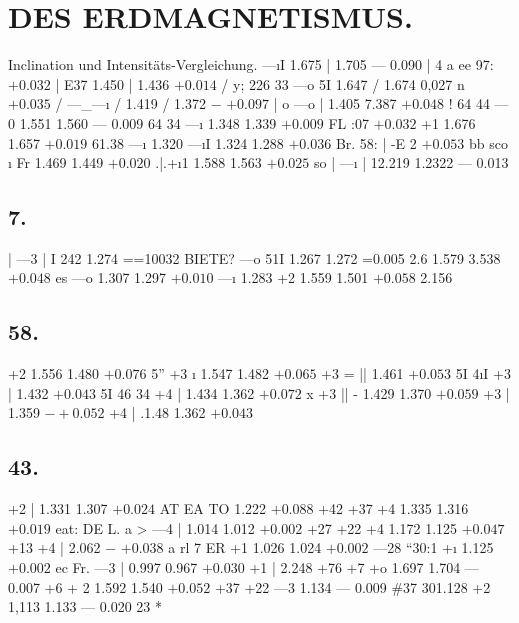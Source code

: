 \documentclass[12pt,a4paper]{article}
\begin{document}
\section*{DES ERDMAGNETISMUS.}
Inclination und Intensitäts-Vergleichung.
---\i{}I 1.675 | 1.705 --- 0.090 | 4 a ee 97\textdegree{}:
$+ 0.032$
| E37 1.450 | 1.436
$+ 0.014$
/ y; 226 33 ---o 5I 1.647 / 1.674 0,027 n%
$+ 0.035$
/ ---\_---\i{} / 1.419 / 1.372
$-$
$+ 0.097$
| o ---o | 1.405 7.387
$+ 0.048$
! 64 44 --- 0 1.551 1.560 --- 0.009 64 34 ---\i{} 1.348 1.339
$+ 0.009$
FL :07%
$+ 0.032$
+1 1.676 1.657
$+ 0.019$
61.38 ---\i{} 1.320 ---\i{}I 1.324 1.288
$+ 0.036$
Br. 58: | -E 2%
$+ 0.053$
bb sco \i{} Fr 1.469 1.449
$+ 0.020$
.|.+\i{}1 1.588 1.563
$+ 0.025$
so | ---\i{} | 12.219 1.2322 --- 0.013

\subsection*{7.}
| ---3 | I 242 1.274 ==10032 BIETE? ---o 51I 1.267 1.272 =0.005 2.6 1.579 3.538
$+ 0.048$
es ---o 1.307 1.297
$+ 0.010$
---\i{} 1.283 +2 1.559 1.501
$+ 0.058$
2.156

\subsection*{58.}
+2 1.556 1.480
$+ 0.076$
5'' +3 \i{} 1.547 1.482
$+ 0.065$
+3 = || 1.461
$+ 0.053$
5I 4\i{}I +3 | 1.432
$+ 0.043$
5I 46 34 +4 | 1.434 1.362
$+ 0.072$
x +3 || - 1.429 1.370
$+ 0.059$
+3 | 1.359
$-+ 0.052$
+4 | .1.48 1.362
$+ 0.043$

\subsection*{43.}
+2 | 1.331 1.307
$+ 0.024$
AT EA TO 1.222
$+ 0.088$
+42 +37 +4 1.335 1.316
$+ 0.019$
eat: DE L. a > ---4 | 1.014 1.012
$+ 0.002$
+27 +22 +4 1.172 1.125
$+ 0.047$
+13 +4 | 2.062
$-$
$+ 0.038$
a rl 7 ER +1 1.026 1.024
$+ 0.002$
---28 ``30:1 +\i{} 1.125
$+ 0.002$
ec \textdegree{} Fr. ---3 | 0.997 0.967
$+ 0.030$
+1 | 2.248 +76 +7 +o 1.697 1.704 --- 0.007 +6 + 2 1.592 1.540
$+ 0.052$
+37 +22 ---3 1.134 --- 0.009 \#37 301.128 +2 1,113 1.133 --- 0.020 23 *


\newpage
\end{document}
